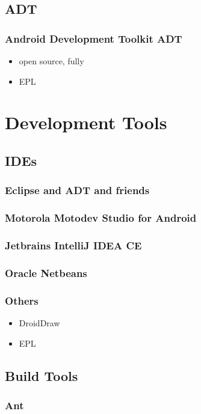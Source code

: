 \documentclass{beamer}
\begin{document}
  \subsection{ADT}
    \begin{frame}
      \frametitle{Android Development Toolkit ADT}
      \begin{itemize}
        \item<1->open source, fully 
        \item<2->EPL
      \end{itemize}
    \end{frame}

\section{Development Tools}

  \subsection{IDEs}

    \begin{frame}
      \frametitle{Eclipse and ADT and friends}
    \end{frame}

    \begin{frame}
      \frametitle{Motorola Motodev Studio for Android}
    \end{frame}

    \begin{frame}
      \frametitle{Jetbrains IntelliJ IDEA CE}
    \end{frame}

    \begin{frame}
      \frametitle{Oracle Netbeans}
    \end{frame}

    \begin{frame}
      \frametitle{Others}
        \begin{itemize}
        \item<1->DroidDraw
        \item<2->EPL
      \end{itemize}
    \end{frame}

\subsection{Build Tools}

\begin{frame}
  \frametitle{Ant}
\end{frame}
\end{document}
